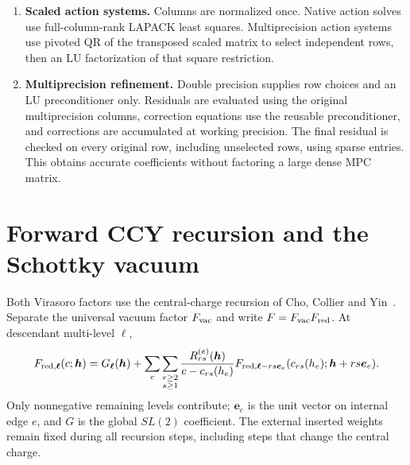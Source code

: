 \documentclass[11pt]{article}
\numberwithin{equation}{section}
\begin{document}
\begin{enumerate}
value and each subsequently computed coefficient is retained. Ward rows,
embedded weights, and single-leg descendant factors are reused. The two
vertex signs share the same local elimination; its dimension is at most four.
\item \textbf{Scaled action systems.} Columns are normalized once. Native
action solves use full-column-rank LAPACK least squares. Multiprecision action
systems use pivoted QR of the transposed scaled matrix to select independent
rows, then an LU factorization of that square restriction.
\item \textbf{Multiprecision refinement.} Double precision supplies row choices
and an LU preconditioner only. Residuals are evaluated using the original
multiprecision columns, correction equations use the reusable preconditioner,
and corrections are accumulated at working precision. The final residual is
checked on every original row, including unselected rows, using sparse entries.
This obtains accurate coefficients without factoring a large dense MPC matrix.
\end{enumerate}

\section{Forward CCY recursion and the Schottky vacuum}
\label{sec:ccy}

Both Virasoro factors use the central-charge recursion of Cho, Collier and
Yin~\cite{CCY}. Separate the universal vacuum factor $F_{\rm vac}$ and write
$F=F_{\rm vac}F_{\rm red}$. At descendant multi-level $\boldsymbol\ell$,
\begin{equation}
 F_{{\rm red},\boldsymbol\ell}(c;\boldsymbol h)
 =G_{\boldsymbol\ell}(\boldsymbol h)
 +\sum_e\sum_{\substack{r\ge2\\s\ge1}}
 \frac{R_{rs}^{(e)}(\boldsymbol h)}{c-c_{rs}(h_e)}
 F_{{\rm red},\boldsymbol\ell-rs\boldsymbol e_e}
       (c_{rs}(h_e);\boldsymbol h+rs\boldsymbol e_e).
 \label{eq:ccy}
\end{equation}
Only nonnegative remaining levels contribute; $\boldsymbol e_e$ is the unit
vector on internal edge $e$, and $G$ is the global $SL(2)$ coefficient.
The external inserted weights remain fixed during all recursion steps,
including steps that change the central charge.
\end{document}
